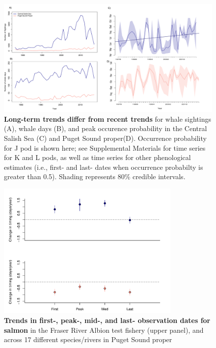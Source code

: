 \documentclass{article}
\begin{document}
\begin{figure}[p]
\includegraphics{../analyses/figures/OrcaPhenPlots/timeseries_1976_assumeSRKW2regs.pdf} 
\caption{\textbf{Long-term trends differ from recent trends} for whale sightings (A), whale days (B), and peak occurence probability in the Central Salish Sea (C) and Puget Sound proper(D). Occurrence probability for J pod is shown here; see Supplemental Materials for time series for K and L pods, as well as time series for other phenological estimates (i.e., first- and last- dates when occurrence probabilty is greater than 0.5). Shading represents 80\% credible intervals.}
 \label{fig:timeseries}
 \end{figure}
 

\begin{figure}[p]
\includegraphics[width=0.8\textwidth]{../analyses/figures/salmon_shifts_lmm.pdf} 
\caption{\textbf{Trends in first-, peak-, mid-, and last- observation dates for salmon} in the Fraser River Albion test fishery (upper panel), and across 17 different species/rivers in Puget Sound proper}
 \label{fig:shifts}
 \end{figure}
\end{document}
